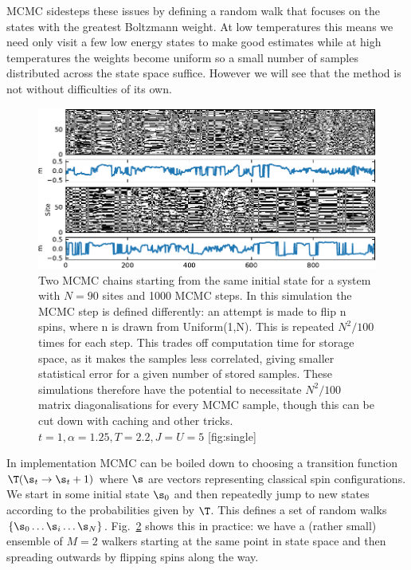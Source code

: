 {MCMC} sidesteps these issues by defining a random walk that focuses on the states with the greatest Boltzmann weight. At low temperatures this means we need only visit a few low energy states to make good estimates while at high temperatures the weights become uniform so a small number of samples distributed across the state space suffice. However we will see that the method is not without difficulties of its own.

\begin{figure}
\hypertarget{fig:single}{%
\centering
\includegraphics{figs/lsr/single.pdf}
\caption{Two MCMC chains starting from the same initial state for a system with \(N = 90\) sites and 1000 MCMC steps. In this simulation the MCMC step is defined differently: an attempt is made to flip n spins, where n is drawn from Uniform(1,N). This is repeated \(N^2/100\) times for each step. This trades off computation time for storage space, as it makes the samples less correlated, giving smaller statistical error for a given number of stored samples. These simulations therefore have the potential to necessitate \(N^2/100\) matrix diagonalisations for every MCMC sample, though this can be cut down with caching and other tricks. \(t = 1, \alpha = 1.25, T = 2.2, J = U = 5\) \protect\hypertarget{fig:single}{}{{[}fig:single{]}}}\label{fig:single}
}
\end{figure}

In implementation {MCMC} can be boiled down to choosing a transition function \(\T(\s_{t} \rightarrow \s_t+1)\) where \(\s\) are vectors representing classical spin configurations. We start in some initial state \(\s_0\) and then repeatedly jump to new states according to the probabilities given by \(\T\). This defines a set of random walks \(\{\s_0\ldots \s_i\ldots \s_N\}\). Fig.~\protect\hyperlink{fig:single}{2} shows this in practice: we have a (rather small) ensemble of \(M = 2\) walkers starting at the same point in state space and then spreading outwards by flipping spins along the way.

